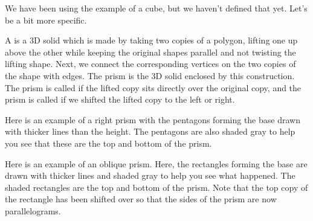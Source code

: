 \documentclass{ximera}
\begin{document}
We have been using the example of a cube, but we haven't defined that yet. Let's be a bit more specific.

\begin{definition}
A  is a 3D solid which is made by taking two copies of a polygon, lifting one up above the other while keeping the original shapes parallel and not twisting the lifting shape. Next, we connect the corresponding vertices on the two copies of the shape with edges. The prism is the 3D solid enclosed by this construction. The prism is called  if the lifted copy sits directly over the original copy, and the prism is called  if we shifted the lifted copy to the left or right.

Here is an example of a right prism with the pentagons forming the base drawn with thicker lines than the height. The pentagons are also shaded gray to help you see that these are the top and bottom of the prism.
\begin{center}
\end{center}

Here is an example of an oblique prism. Here, the rectangles forming the base are drawn with thicker lines and shaded gray to help you see what happened. The shaded rectangles are the top and bottom of the prism. Note that the top copy of the rectangle has been shifted over so that the sides of the prism are now parallelograms.
\begin{center}
\end{center}
\end{definition}
\end{document}
